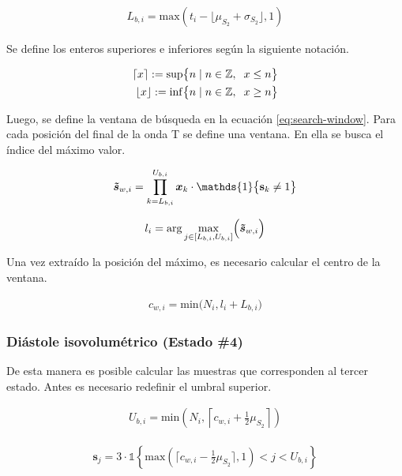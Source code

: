 \begin{align}
  L_{b,i} = \mathrm{max}(t_i-\lfloor \mu_{S_2} + \sigma_{S_2} \rfloor,1)
\end{align}

\indent Se define los enteros superiores e inferiores según la siguiente notación.

\begin{align*}
  \lceil x \rceil := \mathrm{sup}\big\{n \; | \; n \in \mathbb{Z}, \hspace{2mm} x \leq n\big\} \\
  \lfloor x \rfloor := \mathrm{inf}\big\{n \; | \; n \in \mathbb{Z}, \hspace{2mm} x \geq n\big\}
\end{align*}

\indent Luego, se define la ventana de búsqueda en la ecuación \ref{eq:search-window}. Para cada posición del final
de la onda T se define una ventana. En ella se busca el índice del máximo valor.

\begin{align}
  \label{eq:search-window}
  \bm{\Tilde{s}}_{w,i} = \prod_{k=L_{b,i}}^{U_{b,i}} \bm{x}_k \cdot \mathds{1}\big\{\mathbf{s}_k \neq 1\big\}
\end{align}

\begin{align}
  l_i = \arg \underset{j \in [L_{b,i},U_{b,i}]}{\mathrm{max}} \Big(\bm{\Tilde{s}}_{w,i}\Big)
\end{align}

\indent Una vez extraído la posición del máximo, es necesario calcular el centro de la ventana.

\begin{align}
  c_{w,i} = \mathrm{min}\Big(N_i,l_i+L_{b,i}\Big)
\end{align}

\subsubsection*{Diástole isovolumétrico (Estado \#4)}

\indent De esta manera es posible calcular las muestras que corresponden al tercer estado. Antes es necesario redefinir el umbral superior.

\begin{align}
  U_{b,i} = \mathrm{min}\left(N_i, \left\lceil  c_{w,i} + \frac{1}{2}\mu_{S_2} \right\rceil \right)
\end{align}

\begin{align}
  \mathbf{s}_j = 3 \cdot \mathds{1}\left\{\mathrm{max}\left(\lceil c_{w,i}-\frac{1}{2}\mu_{S_2}\rceil, 1\right) < j < U_{b,i}\right\}
\end{align}

